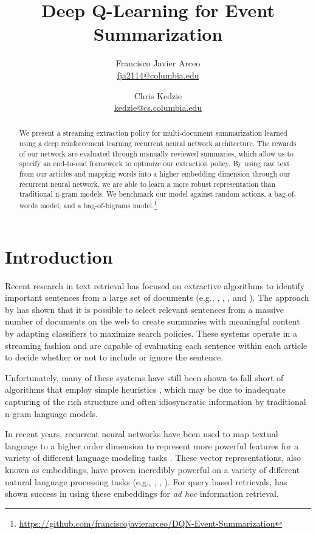 \documentclass[12pt]{article}
\title{Deep Q-Learning for Event Summarization }
\author{
	Francisco Javier Arceo \\ \href{mailto: fja2114@columbia.edu}{\small fja2114@columbia.edu} 
		\and  
	Chris Kedzie \\ \href{mailto: kedzie@cs.columbia.edu}{\small kedzie@cs.columbia.edu} 
	}
\begin{document}
\maketitle

\begin{abstract}
We present a streaming extraction policy for multi-document summarization learned using a deep reinforcement learning recurrent neural network architecture. The rewards of our network are evaluated through manually reviewed summaries, which allow us to specify an end-to-end framework to optimize our extraction policy.  By using raw text from our articles and mapping words into a higher embedding dimension through our recurrent neural network, we are able to learn a more robust representation than traditional n-gram models. We benchmark our model against random actions, a bag-of-words model, and a bag-of-bigrams model.\footnote{ \url{https://github.com/franciscojavierarceo/DQN-Event-Summarization} }
\end{abstract}



\section{Introduction}

Recent research in text retrieval  has focused on extractive algorithms to identify important sentences from a large set of documents (e.g., \cite{diazquery}, \cite{kedzie2015predicting}, \cite{garbacea2015university}, and \cite{kedzieextractive}). The approach by \cite{kedzie2015predicting}  has shown that it is possible to select relevant sentences from a massive number of documents on the web to create summaries with meaningful content by adapting classifiers to maximize search policies. These systems operate in a streaming fashion and are capable of evaluating each sentence within each article to decide whether or not to include or ignore the sentence. 

Unfortunately, many of these systems have still been shown to fall short of algorithms that employ simple heuristics \cite{garbacea2015university}, which may be due to inadequate capturing of the rich structure and often idiosyncratic information by traditional n-gram language models.  

In recent years, recurrent neural networks have been used to map textual language to a higher order dimension to represent more powerful features for a variety of different language modeling tasks \cite{mikolov2010recurrent}. These vector representations, also known as embeddings, have proven incredibly powerful on a variety of different natural language processing tasks (e.g., \cite{bengio2003neural}, \cite{sundermeyer2012lstm}, \cite{kim2016character}). For query based retrievals, \cite{diazquery} has shown success in using these embeddings for \emph{ad hoc} information retrieval.
\end{document}
